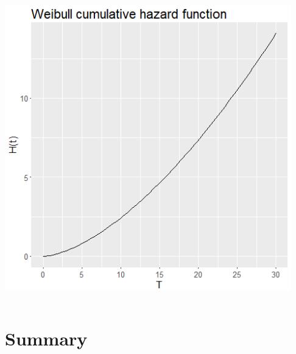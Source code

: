 \begin{frame}
\begin{columns}
\includegraphics[width=0.98\textwidth]{Figures/motorist_cum_haz_weib.png}
\end{columns}
\end{frame}


\section[Summary]{Summary}
\subsection{}
\begin{frame}
\end{frame}

